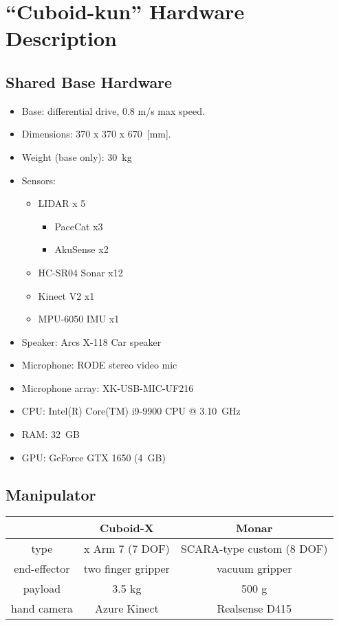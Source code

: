 \section*{``Cuboid-kun'' Hardware Description}
\label{sec:annex-OPL}

\subsection*{Shared Base Hardware}
\begin{itemize}
    \item Base: differential drive, 0.8 m/s max speed.
    \item Dimensions: 370 x 370 x 670~[mm].
    \item Weight (base only): 30~kg
    \item Sensors:
          \begin{itemize}
              \item LIDAR x 5
                    \begin{itemize}
                        \item PaceCat x3
                        \item AkuSense x2
                    \end{itemize}
              \item HC-SR04 Sonar x12
              \item Kinect V2 x1
              \item MPU-6050 IMU x1
          \end{itemize}
    \item Speaker: Arcs X-118 Car speaker
    \item Microphone: RODE stereo video mic
    \item Microphone array: XK-USB-MIC-UF216
    \item CPU: Intel(R) Core(TM) i9-9900 CPU @ 3.10~GHz
    \item RAM: 32~GB
    \item GPU: GeForce GTX 1650 (4~GB)
\end{itemize}

\subsection*{Manipulator}

\begin{table}[h]
    \centering
    \begin{tabular}{c|c|c}
                     & Cuboid-X           & Monar                     \\ \hline
        type         & x Arm 7 (7 DOF)    & SCARA-type custom (8 DOF) \\
        end-effector & two finger gripper & vacuum gripper            \\
        payload      & 3.5 kg             & 500 g                     \\
        hand camera  & Azure Kinect       & Realsense D415            \\
    \end{tabular}
\end{table}

